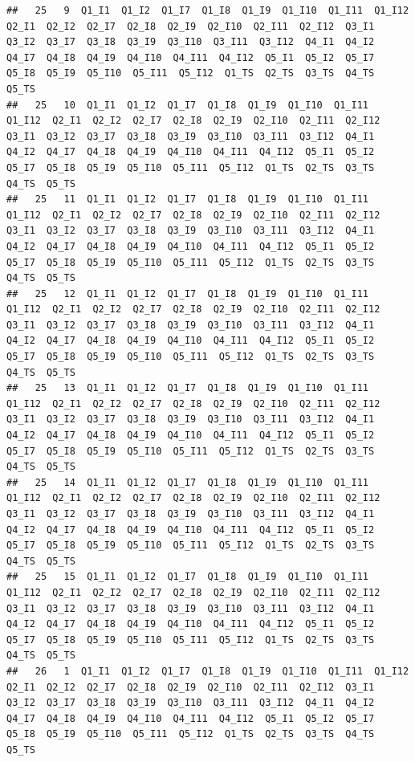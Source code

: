 \documentclass[]{book}
\begin{document}
\begin{verbatim}
##   25   9  Q1_I1  Q1_I2  Q1_I7  Q1_I8  Q1_I9  Q1_I10  Q1_I11  Q1_I12  Q2_I1  Q2_I2  Q2_I7  Q2_I8  Q2_I9  Q2_I10  Q2_I11  Q2_I12  Q3_I1  Q3_I2  Q3_I7  Q3_I8  Q3_I9  Q3_I10  Q3_I11  Q3_I12  Q4_I1  Q4_I2  Q4_I7  Q4_I8  Q4_I9  Q4_I10  Q4_I11  Q4_I12  Q5_I1  Q5_I2  Q5_I7  Q5_I8  Q5_I9  Q5_I10  Q5_I11  Q5_I12  Q1_TS  Q2_TS  Q3_TS  Q4_TS  Q5_TS
##   25   10  Q1_I1  Q1_I2  Q1_I7  Q1_I8  Q1_I9  Q1_I10  Q1_I11  Q1_I12  Q2_I1  Q2_I2  Q2_I7  Q2_I8  Q2_I9  Q2_I10  Q2_I11  Q2_I12  Q3_I1  Q3_I2  Q3_I7  Q3_I8  Q3_I9  Q3_I10  Q3_I11  Q3_I12  Q4_I1  Q4_I2  Q4_I7  Q4_I8  Q4_I9  Q4_I10  Q4_I11  Q4_I12  Q5_I1  Q5_I2  Q5_I7  Q5_I8  Q5_I9  Q5_I10  Q5_I11  Q5_I12  Q1_TS  Q2_TS  Q3_TS  Q4_TS  Q5_TS
##   25   11  Q1_I1  Q1_I2  Q1_I7  Q1_I8  Q1_I9  Q1_I10  Q1_I11  Q1_I12  Q2_I1  Q2_I2  Q2_I7  Q2_I8  Q2_I9  Q2_I10  Q2_I11  Q2_I12  Q3_I1  Q3_I2  Q3_I7  Q3_I8  Q3_I9  Q3_I10  Q3_I11  Q3_I12  Q4_I1  Q4_I2  Q4_I7  Q4_I8  Q4_I9  Q4_I10  Q4_I11  Q4_I12  Q5_I1  Q5_I2  Q5_I7  Q5_I8  Q5_I9  Q5_I10  Q5_I11  Q5_I12  Q1_TS  Q2_TS  Q3_TS  Q4_TS  Q5_TS
##   25   12  Q1_I1  Q1_I2  Q1_I7  Q1_I8  Q1_I9  Q1_I10  Q1_I11  Q1_I12  Q2_I1  Q2_I2  Q2_I7  Q2_I8  Q2_I9  Q2_I10  Q2_I11  Q2_I12  Q3_I1  Q3_I2  Q3_I7  Q3_I8  Q3_I9  Q3_I10  Q3_I11  Q3_I12  Q4_I1  Q4_I2  Q4_I7  Q4_I8  Q4_I9  Q4_I10  Q4_I11  Q4_I12  Q5_I1  Q5_I2  Q5_I7  Q5_I8  Q5_I9  Q5_I10  Q5_I11  Q5_I12  Q1_TS  Q2_TS  Q3_TS  Q4_TS  Q5_TS
##   25   13  Q1_I1  Q1_I2  Q1_I7  Q1_I8  Q1_I9  Q1_I10  Q1_I11  Q1_I12  Q2_I1  Q2_I2  Q2_I7  Q2_I8  Q2_I9  Q2_I10  Q2_I11  Q2_I12  Q3_I1  Q3_I2  Q3_I7  Q3_I8  Q3_I9  Q3_I10  Q3_I11  Q3_I12  Q4_I1  Q4_I2  Q4_I7  Q4_I8  Q4_I9  Q4_I10  Q4_I11  Q4_I12  Q5_I1  Q5_I2  Q5_I7  Q5_I8  Q5_I9  Q5_I10  Q5_I11  Q5_I12  Q1_TS  Q2_TS  Q3_TS  Q4_TS  Q5_TS
##   25   14  Q1_I1  Q1_I2  Q1_I7  Q1_I8  Q1_I9  Q1_I10  Q1_I11  Q1_I12  Q2_I1  Q2_I2  Q2_I7  Q2_I8  Q2_I9  Q2_I10  Q2_I11  Q2_I12  Q3_I1  Q3_I2  Q3_I7  Q3_I8  Q3_I9  Q3_I10  Q3_I11  Q3_I12  Q4_I1  Q4_I2  Q4_I7  Q4_I8  Q4_I9  Q4_I10  Q4_I11  Q4_I12  Q5_I1  Q5_I2  Q5_I7  Q5_I8  Q5_I9  Q5_I10  Q5_I11  Q5_I12  Q1_TS  Q2_TS  Q3_TS  Q4_TS  Q5_TS
##   25   15  Q1_I1  Q1_I2  Q1_I7  Q1_I8  Q1_I9  Q1_I10  Q1_I11  Q1_I12  Q2_I1  Q2_I2  Q2_I7  Q2_I8  Q2_I9  Q2_I10  Q2_I11  Q2_I12  Q3_I1  Q3_I2  Q3_I7  Q3_I8  Q3_I9  Q3_I10  Q3_I11  Q3_I12  Q4_I1  Q4_I2  Q4_I7  Q4_I8  Q4_I9  Q4_I10  Q4_I11  Q4_I12  Q5_I1  Q5_I2  Q5_I7  Q5_I8  Q5_I9  Q5_I10  Q5_I11  Q5_I12  Q1_TS  Q2_TS  Q3_TS  Q4_TS  Q5_TS
##   26   1  Q1_I1  Q1_I2  Q1_I7  Q1_I8  Q1_I9  Q1_I10  Q1_I11  Q1_I12  Q2_I1  Q2_I2  Q2_I7  Q2_I8  Q2_I9  Q2_I10  Q2_I11  Q2_I12  Q3_I1  Q3_I2  Q3_I7  Q3_I8  Q3_I9  Q3_I10  Q3_I11  Q3_I12  Q4_I1  Q4_I2  Q4_I7  Q4_I8  Q4_I9  Q4_I10  Q4_I11  Q4_I12  Q5_I1  Q5_I2  Q5_I7  Q5_I8  Q5_I9  Q5_I10  Q5_I11  Q5_I12  Q1_TS  Q2_TS  Q3_TS  Q4_TS  Q5_TS

\end{verbatim}
\end{document}
